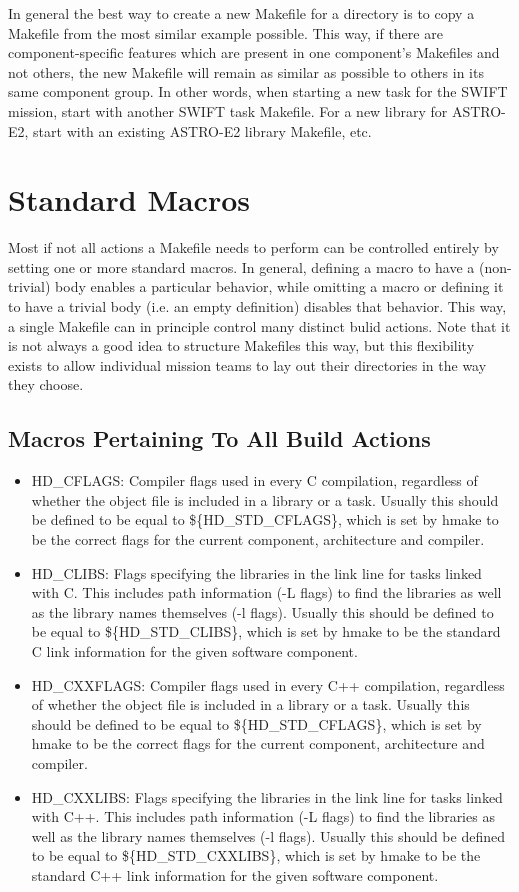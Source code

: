 \documentclass[11pt]{book}
\begin{document}
In general the best way to create a new Makefile for a directory
is to copy a Makefile from the most similar example possible.
This way, if there are component-specific features which are
present in one component's Makefiles and not others, the new
Makefile will remain as similar as possible to others in its
same component group. In other words, when
starting a new task for the SWIFT mission, start with another
SWIFT task Makefile. For a new library for ASTRO-E2, start with
an existing ASTRO-E2 library Makefile, etc.

\section{Standard Macros}
Most if not all actions a Makefile needs to perform can be
controlled entirely by setting one or more standard macros.
In general, defining a macro to have a (non-trivial) body
enables a particular behavior, while omitting a macro or defining
it to have a trivial body (i.e. an empty definition) disables
that behavior. This way, a single Makefile can in principle
control many distinct bulid actions. Note that it is not
always a good idea to structure Makefiles this way, but this
flexibility exists to allow individual mission teams to lay
out their directories in the way they choose.

\subsection{Macros Pertaining To All Build Actions}
\begin{itemize}
\item HD\_CFLAGS: Compiler flags used in every C compilation,
regardless of whether the object file is included in a library or
a task. Usually this should be defined to be equal to
\$\{HD\_STD\_CFLAGS\}, which is set by hmake to be the correct
flags for the current component, architecture and compiler.
\item HD\_CLIBS: Flags specifying the libraries in the link
line for tasks linked with C. This includes path information
(-L flags) to find the
libraries as well as the library names themselves (-l flags).
Usually this should be defined to be equal to \$\{HD\_STD\_CLIBS\},
which is set by hmake to be the standard C link information for
the given software component.
\item HD\_CXXFLAGS: Compiler flags used in every C++ compilation,
regardless of whether the object file is included in a library or
a task. Usually this should be defined to be equal to
\$\{HD\_STD\_CFLAGS\}, which is set by hmake to be the correct
flags for the current component, architecture and compiler.
\item HD\_CXXLIBS: Flags specifying the libraries in the link
line for tasks linked with C++. This includes path information
(-L flags) to find the
libraries as well as the library names themselves (-l flags).
Usually this should be defined to be equal to \$\{HD\_STD\_CXXLIBS\},
which is set by hmake to be the standard C++ link information for
the given software component.
\end{itemize}
\end{document}
